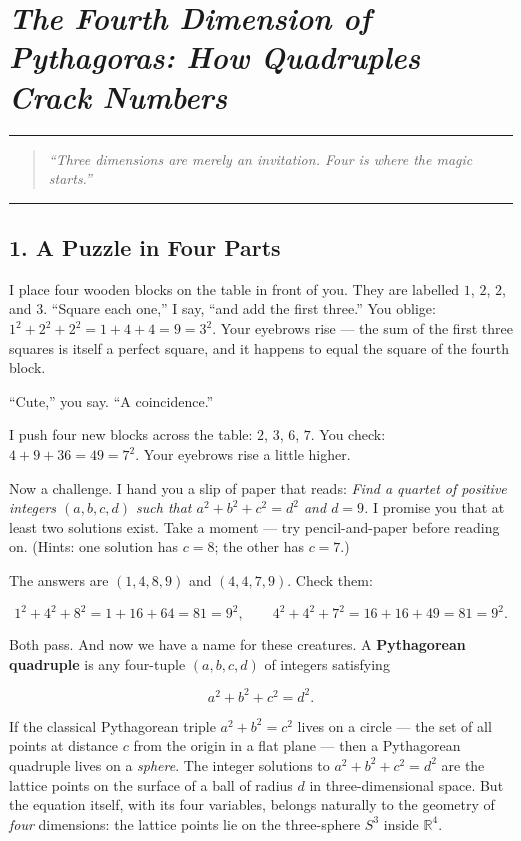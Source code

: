 \chapter{\texorpdfstring{\emph{The Fourth Dimension of Pythagoras: How Quadruples Crack Numbers}}{The Fourth Dimension of Pythagoras: How Quadruples Crack Numbers}}
\bigskip\noindent\rule{\linewidth}{0.4pt}\bigskip

\begin{quote}
\emph{``Three dimensions are merely an invitation. Four is where the magic starts.''}
\end{quote}

\bigskip\noindent\rule{\linewidth}{0.4pt}\bigskip

\section{1. A Puzzle in Four Parts}
I place four wooden blocks on the table in front of you. They are labelled \(1\), \(2\), \(2\), and \(3\). ``Square each one,'' I say, ``and add the first three.'' You oblige: \(1^2 + 2^2 + 2^2 = 1 + 4 + 4 = 9 = 3^2\). Your eyebrows rise --- the sum of the first three squares is itself a perfect square, and it happens to equal the square of the fourth block.

``Cute,'' you say. ``A coincidence.''

I push four new blocks across the table: \(2\), \(3\), \(6\), \(7\). You check: \(4 + 9 + 36 = 49 = 7^2\). Your eyebrows rise a little higher.

Now a challenge. I hand you a slip of paper that reads: \emph{Find a quartet of positive integers \((a, b, c, d)\) such that \(a^2 + b^2 + c^2 = d^2\) and \(d = 9\).} I promise you that at least two solutions exist. Take a moment --- try pencil-and-paper before reading on. (Hints: one solution has \(c = 8\); the other has \(c = 7\).)

The answers are \((1, 4, 8, 9)\) and \((4, 4, 7, 9)\). Check them:

\[1^2 + 4^2 + 8^2 = 1 + 16 + 64 = 81 = 9^2, \qquad 4^2 + 4^2 + 7^2 = 16 + 16 + 49 = 81 = 9^2.\]

Both pass. And now we have a name for these creatures. A \textbf{Pythagorean quadruple} is any four-tuple \((a, b, c, d)\) of integers satisfying

\[a^2 + b^2 + c^2 = d^2.\]

If the classical Pythagorean triple \(a^2 + b^2 = c^2\) lives on a circle --- the set of all points at distance \(c\) from the origin in a flat plane --- then a Pythagorean quadruple lives on a \emph{sphere}. The integer solutions to \(a^2 + b^2 + c^2 = d^2\) are the lattice points on the surface of a ball of radius \(d\) in three-dimensional space. But the equation itself, with its four variables, belongs naturally to the geometry of \emph{four} dimensions: the lattice points lie on the three-sphere \(S^3\) inside \(\mathbb{R}^4\).

